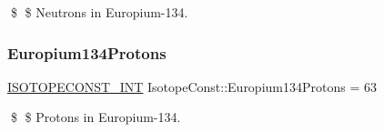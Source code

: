 \$ \$ Neutrons in Europium-\/134. \mbox{\label{group___isotope_const-_europium-_eu134_ga553271d334ff231f0f2856e1c3aa03c8}} 
\subsubsection{\texorpdfstring{Europium134\+Protons}{Europium134Protons}}
{\footnotesize\ttfamily \mbox{\hyperlink{group___isotope_const-_macros_ga5f18360b3e99483a35c32d789e62621c}{I\+S\+O\+T\+O\+P\+E\+C\+O\+N\+S\+T\+\_\+\+I\+NT}} Isotope\+Const\+::\+Europium134\+Protons = 63}

\$ \$ Protons in Europium-\/134. 